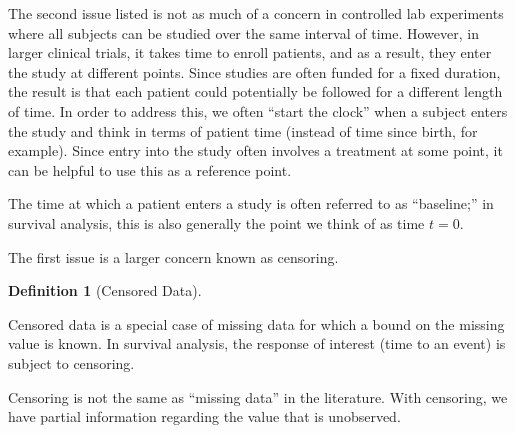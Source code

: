 \documentclass[
  letterpaper,
  DIV=11,
  numbers=noendperiod]{scrreprt}
\theoremstyle{definition}
\newtheorem{definition}{Definition}[chapter]
\theoremstyle{definition}
\theoremstyle{remark}
\begin{document}
The second issue listed is not as much of a concern in controlled lab
experiments where all subjects can be studied over the same interval of
time. However, in larger clinical trials, it takes time to enroll
patients, and as a result, they enter the study at different points.
Since studies are often funded for a fixed duration, the result is that
each patient could potentially be followed for a different length of
time. In order to address this, we often ``start the clock'' when a
subject enters the study and think in terms of patient time (instead of
time since birth, for example). Since entry into the study often
involves a treatment at some point, it can be helpful to use this as a
reference point.

\begin{tcolorbox}[enhanced jigsaw, left=2mm, toprule=.15mm, arc=.35mm, breakable, opacitybacktitle=0.6, opacityback=0, rightrule=.15mm, colbacktitle=quarto-callout-note-color!10!white, coltitle=black, leftrule=.75mm, toptitle=1mm, colframe=quarto-callout-note-color-frame, titlerule=0mm, title=\textcolor{quarto-callout-note-color}{\faInfo}\hspace{0.5em}{Note}, bottomrule=.15mm, colback=white, bottomtitle=1mm]

The time at which a patient enters a study is often referred to as
``baseline;'' in survival analysis, this is also generally the point we
think of as time \(t = 0\).

\end{tcolorbox}

The first issue is a larger concern known as censoring.

\begin{definition}[Censored
Data]\protect\hypertarget{def-censored-data}{}\label{def-censored-data}

Censored data is a special case of missing data for which a bound on the
missing value is known. In survival analysis, the response of interest
(time to an event) is subject to censoring.

\end{definition}

\begin{tcolorbox}[enhanced jigsaw, left=2mm, toprule=.15mm, arc=.35mm, breakable, opacitybacktitle=0.6, opacityback=0, rightrule=.15mm, colbacktitle=quarto-callout-warning-color!10!white, coltitle=black, leftrule=.75mm, toptitle=1mm, colframe=quarto-callout-warning-color-frame, titlerule=0mm, title=\textcolor{quarto-callout-warning-color}{\faExclamationTriangle}\hspace{0.5em}{Warning}, bottomrule=.15mm, colback=white, bottomtitle=1mm]

Censoring is not the same as ``missing data'' in the literature. With
censoring, we have partial information regarding the value that is
unobserved.

\end{tcolorbox}
\end{document}
